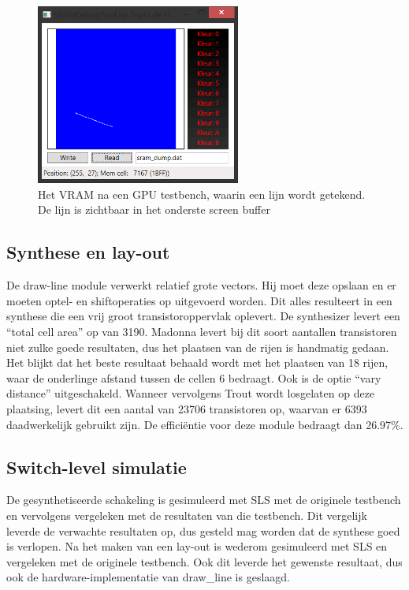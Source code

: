\documentclass{scrartcl} %
\begin{document}
\begin{figure}[H]
	\centering
	\includegraphics[width=0.6\textwidth]{resource/sram_dump.png}
	\caption{Het VRAM na een GPU testbench, waarin een lijn wordt getekend. De lijn is zichtbaar in het onderste screen buffer}
	\label{fig:draw-line-sram-dump}
\end{figure}

\subsection{Synthese en lay-out}
De draw-line module verwerkt relatief grote vectors. Hij moet deze opslaan en er moeten optel- en shiftoperaties op uitgevoerd worden. Dit alles resulteert in een synthese die een vrij groot transistoroppervlak oplevert. De synthesizer levert een ``total cell area'' op van 3190. Madonna levert bij dit soort aantallen transistoren niet zulke goede resultaten, dus het plaatsen van de rijen is handmatig gedaan. Het blijkt dat het beste resultaat behaald wordt met het plaatsen van 18 rijen, waar de onderlinge afstand tussen de cellen 6 bedraagt. Ook is de optie ``vary distance'' uitgeschakeld. Wanneer vervolgens Trout wordt losgelaten op deze plaatsing, levert dit een aantal van 23706 transistoren op, waarvan er 6393 daadwerkelijk gebruikt zijn. De efficiëntie voor deze module bedraagt dan 26.97\%.

\subsection{Switch-level simulatie}
De gesynthetiseerde schakeling is gesimuleerd met SLS met de originele testbench en vervolgens vergeleken met de resultaten van die testbench. Dit vergelijk leverde de verwachte resultaten op, dus gesteld mag worden dat de synthese goed is verlopen. Na het maken van een lay-out is wederom gesimuleerd met SLS en vergeleken met de originele testbench. Ook dit leverde het gewenste resultaat, dus ook de hardware-implementatie van draw\_line is geslaagd.
\end{document}
